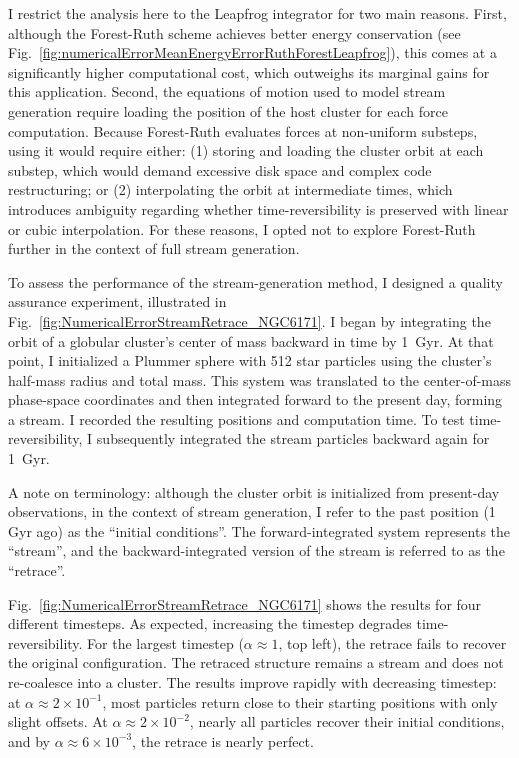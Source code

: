         I restrict the analysis here to the Leapfrog integrator for two main reasons. First, although the Forest-Ruth scheme achieves better energy conservation (see Fig.~\ref{fig:numericalErrorMeanEnergyErrorRuthForestLeapfrog}), this comes at a significantly higher computational cost, which outweighs its marginal gains for this application. Second, the equations of motion used to model stream generation require loading the position of the host cluster for each force computation. Because Forest-Ruth evaluates forces at non-uniform substeps, using it would require either: (1) storing and loading the cluster orbit at each substep, which would demand excessive disk space and complex code restructuring; or (2) interpolating the orbit at intermediate times, which introduces ambiguity regarding whether time-reversibility is preserved with linear or cubic interpolation. For these reasons, I opted not to explore Forest-Ruth further in the context of full stream generation.

        To assess the performance of the stream-generation method, I designed a quality assurance experiment, illustrated in Fig.~\ref{fig:NumericalErrorStreamRetrace_NGC6171}. I began by integrating the orbit of a globular cluster's center of mass backward in time by 1~Gyr. At that point, I initialized a Plummer sphere with 512 star particles using the cluster's half-mass radius and total mass. This system was translated to the center-of-mass phase-space coordinates and then integrated forward to the present day, forming a stream. I recorded the resulting positions and computation time. To test time-reversibility, I subsequently integrated the stream particles backward again for 1~Gyr.

        A note on terminology: although the cluster orbit is initialized from present-day observations, in the context of stream generation, I refer to the past position (1 Gyr ago) as the ``initial conditions''. The forward-integrated system represents the ``stream'', and the backward-integrated version of the stream is referred to as the ``retrace''.

        Fig.~\ref{fig:NumericalErrorStreamRetrace_NGC6171} shows the results for four different timesteps. As expected, increasing the timestep degrades time-reversibility. For the largest timestep ($\alpha \approx 1$, top left), the retrace fails to recover the original configuration. The retraced structure remains a stream and does not re-coalesce into a cluster. The results improve rapidly with decreasing timestep: at $\alpha \approx 2 \times 10^{-1}$, most particles return close to their starting positions with only slight offsets. At $\alpha \approx 2 \times 10^{-2}$, nearly all particles recover their initial conditions, and by $\alpha \approx 6 \times 10^{-3}$, the retrace is nearly perfect.

